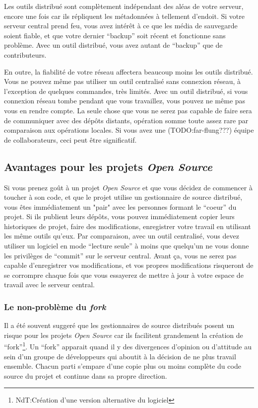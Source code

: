 Les outils distribué sont complètement indépendant des aléas de votre serveur,
encore une fois car ils répliquent les métadonnées à tellement d'endoit. Si
votre serveur central prend feu, vous avez intérêt à ce que les média de 
sauvegarde soient fiable, et que votre dernier ``backup'' soit récent et
fonctionne sans problème. Avec un outil distribué, vous avez autant de 
``backup'' que de contributeurs.

En outre, la fiabilité de votre réseau affectera beaucoup moins les
outils distribué. Vous ne pouvez même pas utiliser un outil centralisé
sans connexion réseau, à l'exception de quelques commandes, très limités. 
Avec un outil distribué, si vous connexion réseau tombe pendant que vous
travaillez, vous pouvez ne même pas vous en rendre compte. La seule chose
que vous ne serez pas capable de faire sera de communiquer avec des dépôts
distants, opération somme toute assez rare par comparaison aux opérations
locales. Si vous avez une (TODO:far-flung???) équipe de collaborateurs, 
ceci peut être significatif.

\subsection{Avantages pour les projets \textit{Open Source}}

Si vous prenez goût à un projet \textit{Open Source} et que vous
décidez de commencer à toucher à son code, et que le projet utilise
un gestionnaire de source distribué, vous êtes immédiatement un "pair"
avec les personnes formant le ``coeur'' du projet. Si ils publient
leurs dépôts, vous pouvez immédiatement copier leurs historiques de
projet, faire des modifications, enregistrer votre travail en utilisant
les même outils qu'eux. Par comparaison, avec un outil centralisé, vous
devez utiliser un logiciel en mode ``lecture seule'' à moins que 
quelqu'un ne vous donne les privilèges de ``commit'' sur le serveur
central. Avant ça, vous ne serez pas capable d'enregistrer vos 
modifications, et vos propres modifications risqueront de se 
corrompre chaque fois que vous essayerez de mettre à jour à votre
espace de travail avec le serveur central.

\subsubsection{Le non-problème du \textit{fork}}

Il a été souvent suggeré que les gestionnaires de source distribués
posent un risque pour les projets \textit{Open Source} car ils 
facilitent grandement la création de ``fork''\footnote{NdT:Création 
d'une version alternative du logiciel}. %
Un ``fork'' apparait quand il y des divergences d'opinion ou d'attitude
au sein d'un groupe de développeurs qui aboutit à la décision de ne 
plus travail ensemble. Chacun parti s'empare d'une copie plus ou moins
complète du code source du projet et continue dans sa propre direction.


